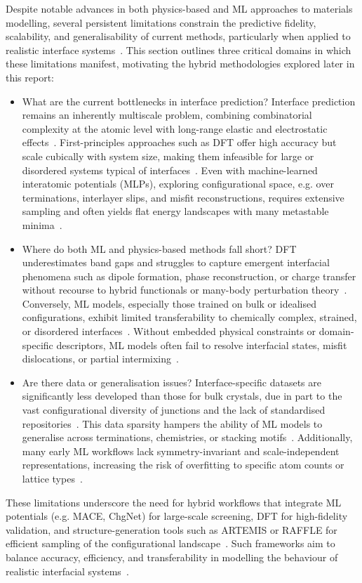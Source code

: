 Despite notable advances in both physics-based and ML approaches to materials modelling, several persistent limitations constrain the predictive fidelity, scalability, and generalisability of current methods, particularly when applied to realistic interface systems~\cite{Schutt2019-sz, Batzner2022-fd, Gerber2023-yd}.
This section outlines three critical domains in which these limitations manifest, motivating the hybrid methodologies explored later in this report:
\begin{itemize}
  \item What are the current bottlenecks in interface prediction?
  Interface prediction remains an inherently multiscale problem, combining combinatorial complexity at the atomic level with long-range elastic and electrostatic effects~\nocite{}.
  First-principles approaches such as DFT offer high accuracy but scale cubically with system size, making them infeasible for large or disordered systems typical of interfaces~\cite{Butler2019-ws, Leung2020-tv}.
  Even with machine-learned interatomic potentials (MLPs), exploring configurational space, e.g. over terminations, interlayer slips, and misfit reconstructions, requires extensive sampling and often yields flat energy landscapes with many metastable minima~\cite{Batzner2022-fd, Deng2023-tg, Owen2024-wp}.
  \item Where do both ML and physics-based methods fall short?
  DFT underestimates band gaps and struggles to capture emergent interfacial phenomena such as dipole formation, phase reconstruction, or charge transfer without recourse to hybrid functionals or many-body perturbation theory~\cite{Butler2019-ws, Leung2020-tv, Rosen2022-pw}.
  Conversely, ML models, especially those trained on bulk or idealised configurations, exhibit limited transferability to chemically complex, strained, or disordered interfaces~\cite{Wang2024-tn}.
  Without embedded physical constraints or domain-specific descriptors, ML models often fail to resolve interfacial states, misfit dislocations, or partial intermixing~\cite{Leitherer2023-ew, Gerber2023-yd}.
  \newpage \item Are there data or generalisation issues?
  Interface-specific datasets are significantly less developed than those for bulk crystals, due in part to the vast configurational diversity of junctions and the lack of standardised repositories~\nocite{}.
  This data sparsity hampers the ability of ML models to generalise across terminations, chemistries, or stacking motifs~\cite{Butler2019-ws, Leung2020-tv}.
  Additionally, many early ML workflows lack symmetry-invariant and scale-independent representations, increasing the risk of overfitting to specific atom counts or lattice types~\cite{Schutt2018-xc, Schutt2019-sz}.
\end{itemize}
These limitations underscore the need for hybrid workflows that integrate ML potentials (e.g. MACE, ChgNet) for large-scale screening, DFT for high-fidelity validation, and structure-generation tools such as ARTEMIS or RAFFLE for efficient sampling of the configurational landscape~\nocite{}.
Such frameworks aim to balance accuracy, efficiency, and transferability in modelling the behaviour of realistic interfacial systems~\cite{Taylor2020-nl, raffle_paper, Deng2023-tg}.


